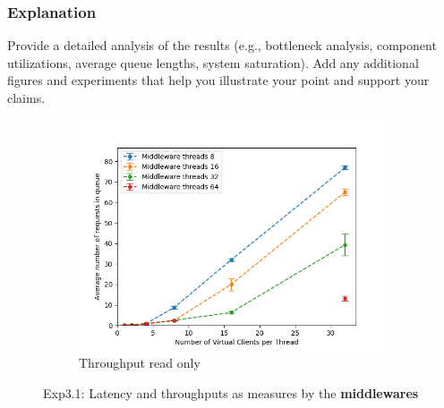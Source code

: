 \documentclass[11pt,a4paper]{article}
\begin{document}
\subsubsection{Explanation}

Provide a detailed analysis of the results (e.g., bottleneck analysis, component utilizations, average queue lengths, system saturation). Add any additional figures and experiments that help you illustrate your point and support your claims.


\begin{figure}[H]
\centering
\begin{subfigure}{.5\textwidth}
      \centering
    \includegraphics[width=\textwidth]{img/exp4_1/exp4_1__queuesize_middleware_write_1.png}
    \caption{Throughput read only}
    \label{fig:mesh1}
\end{subfigure}
\caption{Exp3.1: Latency and throughputs as measures by the \textbf{middlewares}}
\label{fig:test}
\end{figure}


\end{document}
